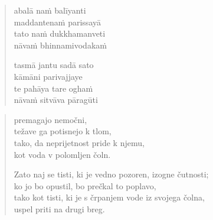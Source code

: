 
\clearpage
\begin{verse}

abalā naṁ balīyanti\\
maddantenaṁ parissayā\\
tato naṁ dukkhamanveti\\
nāvaṁ bhinnamivodakaṁ

tasmā jantu sadā sato\\
kāmāni parivajjaye\\
te pahāya tare oghaṁ\\
nāvaṁ sitvāva pāragūti

\end{verse}


\clearpage
\begin{verse}

premagajo nemočni,\\
težave ga potisnejo k tlom,\\
tako, da neprijetnost pride k njemu,\\
kot voda v polomljen čoln.

Zato naj se tisti, ki je vedno pozoren, izogne čutnosti;\\
ko jo bo opustil, bo prečkal to poplavo,\\
tako kot tisti, ki je s črpanjem vode iz svojega čolna,\\
uspel priti na drugi breg.

\end{verse}

